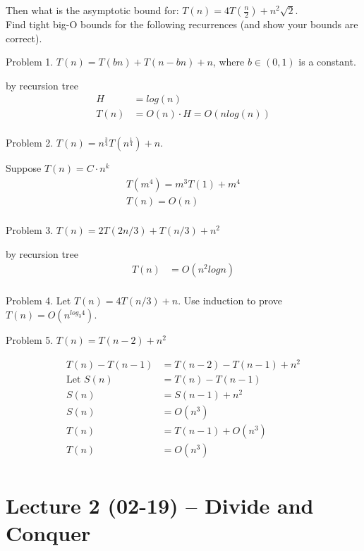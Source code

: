 Then what is the asymptotic bound for: $T(n) = 4T(\frac{n}{2}) + n^2\sqrt{2}$.
\\
Find tight big-O bounds for the following recurrences (and show your bounds are correct).

Problem 1. $T(n) = T(bn) + T(n - bn) + n$, where $b \in (0,1)$ is a constant.
\begin{solution}
    by recursion tree
    \begin{align*}
        H&=log(n)\\
        T(n)&=O(n)\cdot H=O(nlog(n))\\
    \end{align*}
    \end{solution}
Problem 2. $T(n) = n^{\frac{3}{4}}T(n^{\frac{1}{4}}) + n$.
\begin{solution}
    Suppose $ T(n)=C\cdot n^k $ 
    \begin{align*}
        T(m^4)=m^3T(1)+m^4\\
        T(n)=O(n)\\
    \end{align*}
\end{solution}
Problem 3. $T(n) = 2T(2n/3) + T(n/3) + n^2$
\begin{solution}
    by recursion tree
    \begin{align*}
        T(n)&=O(n^2logn)\\
    \end{align*}
\end{solution}
Problem 4. Let $T(n) = 4T(n/3) + n$. Use induction to prove $T(n) = O(n^{log_3 4})$.

Problem 5. $T(n) = T(n-2) + n^2$
\begin{solution}
    \begin{align*}{}{}
    T(n)-T(n-1)&=T(n-2)-T(n-1)+n^2\\
    \text{Let } S(n)&=T(n)-T(n-1)\\
    S(n)&=S(n-1)+n^2\\
    S(n)&=O(n^3)\\
    T(n)&=T(n-1)+O(n^3)\\
    T(n)&=O(n^3)\\
    \end{align*}
\end{solution}
\section{Lecture 2 (02-19) -- {Divide and Conquer}}
